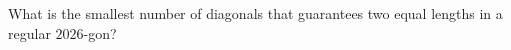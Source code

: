 What is the smallest number of diagonals that guarantees two equal lengths in a regular $2026$-gon?
